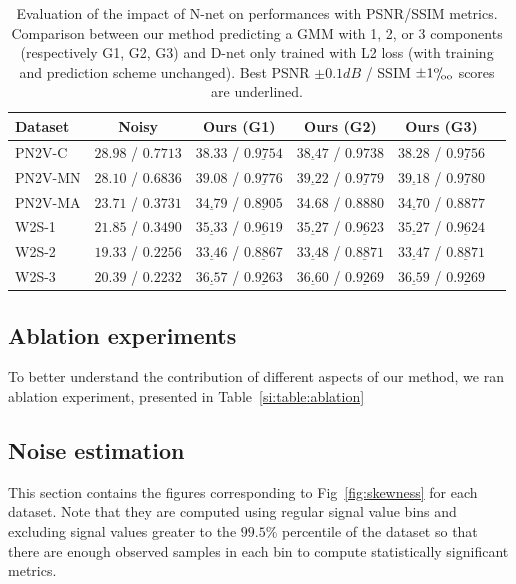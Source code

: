 \documentclass{article}
\def\permille{\ensuremath{{}^\text{o}\mkern-5mu/\mkern-3mu_\text{oo}}}
\begin{document}
\begin{table}[ht]
\caption{Evaluation of the impact of N-net on performances with PSNR/SSIM metrics. Comparison between our method predicting a GMM with 1, 2, or 3 components (respectively G1, G2, G3) and D-net only trained with L2 loss (with training and prediction scheme unchanged).
Best PSNR $\pm0.1dB$ / SSIM $\pm1\permille$ scores are underlined.}
\label{si:table:results}
\begin{center}
\begin{sc}
\begin{tabular}{lccccc}
\toprule
Dataset & Noisy & Ours (G1) & Ours (G2) & Ours (G3) \\
\midrule
PN2V-C & $28.98$ / $0.7713$ & $38.33$ / $\underline{0.9754}$ & $\underline{38.47}$ / $0.9738$ & $38.28$ / $\underline{0.9756}$ \\
PN2V-MN & $28.10$ / $0.6836$ & $39.08$ / $\underline{0.9776}$ & $\underline{39.22}$ / $\underline{0.9779}$ & $\underline{39.18}$ / $\underline{0.9780}$ \\
PN2V-MA & $23.71$ / $0.3731$ & $\underline{34.79}$ / $\underline{0.8905}$ & $34.68$ / $0.8880$ & $\underline{34.70}$ / $0.8877$ \\
W2S-1 & $21.85$ / $0.3490$ & $\underline{35.33}$ / $\underline{0.9619}$ & $\underline{35.27}$ / $\underline{0.9623}$ & $\underline{35.27}$ / $\underline{0.9624}$ \\
W2S-2 & $19.33$ / $0.2256$ & $\underline{33.46}$ / $\underline{0.8867}$ & $\underline{33.48}$ / $\underline{0.8871}$ & $\underline{33.47}$ / $\underline{0.8871}$ \\
W2S-3 & $20.39$ / $0.2232$ & $\underline{36.57}$ / $\underline{0.9263}$ & $\underline{36.60}$ / $\underline{0.9269}$ & $\underline{36.59}$ / $\underline{0.9269}$ \\
\bottomrule
\end{tabular}
\end{sc}
\end{center}
\end{table}
\FloatBarrier

\subsection{Ablation experiments}
To better understand the contribution of different aspects of our method, we ran ablation experiment, presented in Table~\ref{si:table:ablation}

\FloatBarrier
\subsection{Noise estimation}
\label{si:skewness}
This section contains the figures corresponding to Fig~\ref{fig:skewness} for each dataset.
Note that they are computed using regular signal value bins and excluding signal values greater to the $99.5\%$ percentile of the dataset so that there are enough observed samples in each bin to compute statistically significant metrics.
\end{document}
